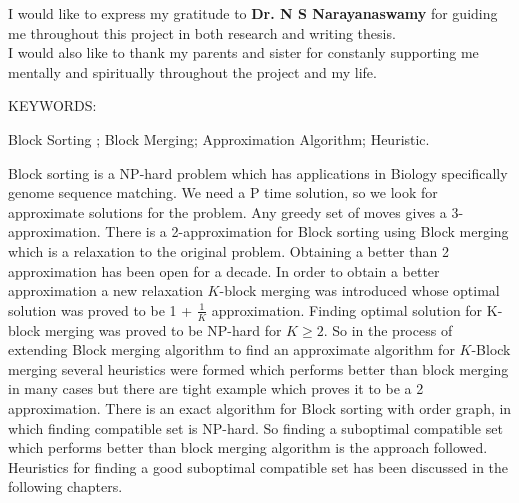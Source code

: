 \documentclass[BTech]{iitmdiss}
\begin{document}
\acknowledgements

I would like to express my gratitude to \textbf{Dr. N S Narayanaswamy} for guiding me throughout this project in both research and writing thesis. \\
I would also like to thank my parents and sister for constanly supporting me mentally and spiritually throughout the project and my life.


\abstract

\noindent KEYWORDS: \hspace*{0.5em} \parbox[t]{4.4in}{Block Sorting ; Block Merging;
  Approximation Algorithm; Heuristic.}

\vspace*{24pt}

\noindent Block sorting is a NP-hard problem which has applications in Biology specifically genome sequence matching. We need a P time solution, so we look for approximate solutions for the problem. Any greedy set of moves gives a 3-approximation. There is a 2-approximation for Block sorting using Block merging which is a relaxation to the original problem. Obtaining a better than 2 approximation has been open for a decade. In order to obtain a better approximation a new relaxation $K$-block merging was introduced whose optimal solution was proved to be 1 + $\frac{1}{K}$ approximation. Finding optimal solution for K-block merging was proved to be NP-hard for $K\geq 2$. So in the process of extending Block merging algorithm to find an approximate algorithm for $K$-Block merging several heuristics were formed which performs better than block merging in many cases but there are tight example which proves it to be a 2 approximation. There is an exact algorithm for Block sorting with order graph, in which finding compatible set is NP-hard. So finding a suboptimal compatible set which performs better than block merging algorithm is the approach followed. Heuristics for finding a good suboptimal compatible set has been discussed in the following chapters.
\pagebreak


\begin{singlespace}
\tableofcontents
\thispagestyle{empty}

\listoftables
{}
\listoffigures
{}
\end{singlespace}
\end{document}
